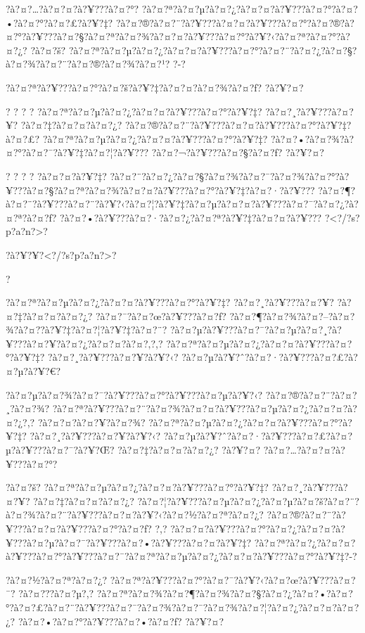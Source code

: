 \documentclass[11pt, openany]{book}
\begin{document}
{{{{{{{{{{{?à?¤?\ldots{}?à?¤?¤?à?¥???à?¤?°?
?à?¤?ª?à?¤?µ?à?¤?¿?à?¤?¤?à?¥???à?¤?°?à?¤?•?à?¤?°?à?¤?£?à?¥?‡?
?à?¤?®?à?¤?¨?à?¥???à?¤?¤?à?¥???à?¤?°?à?¤?®?à?¤?°?à?¥???à?¤?§?à?¤?ª?à?¤?¾?à?¤?¤?à?¥???à?¤?°?à?¥?‹?à?¤?ª?à?¤?°?à?¤?¿?
?à?¤?š?
?à?¤?ª?à?¤?µ?à?¤?¿?à?¤?¤?à?¥???à?¤?°?à?¤?¨?à?¤?¿?à?¤?§?à?¤?¾?à?¤?¨?à?¤?®?à?¤?¾?à?¤?¹?
?-?

?à?¤?ª?à?¥???à?¤?°?à?¤?š?à?¥?‡?à?¤?¤?à?¤?¾?à?¤?ƒ? ?à?¥?¤?

? ? ? ? ?à?¤?ª?à?¤?µ?à?¤?¿?à?¤?¤?à?¥???à?¤?°?à?¥?‡? ?à?¤?¸?à?¥???à?¤?¥?
?à?¤?‡?à?¤?¤?à?¤?¿? ?à?¤?®?à?¤?¨?à?¥???à?¤?¤?à?¥???à?¤?°?à?¥?‡?à?¤?£?
?à?¤?ª?à?¤?µ?à?¤?¿?à?¤?¤?à?¥???à?¤?°?à?¥?‡?
?à?¤?•?à?¤?¾?à?¤?°?à?¤?¯?à?¥?‡?à?¤?¦?à?¥??? ?à?¤?¬?à?¥???à?¤?§?à?¤?ƒ?
?à?¥?¤?

? ? ? ? ?à?¤?¤?à?¥?‡?
?à?¤?¨?à?¤?¿?à?¤?§?à?¤?¾?à?¤?¯?à?¤?¾?à?¤?°?à?¥???à?¤?§?à?¤?ª?à?¤?¾?à?¤?¤?à?¥???à?¤?°?à?¥?‡?à?¤?·?à?¥???
?à?¤?¶?à?¤?¨?à?¥???à?¤?¨?à?¥?‹?à?¤?¦?à?¥?‡?à?¤?µ?à?¤?¤?à?¥???à?¤?¯?à?¤?¿?à?¤?ª?à?¤?ƒ?
?à?¤?•?à?¥???à?¤?·?à?¤?¿?à?¤?ª?à?¥?‡?à?¤?¤?à?¥???
?\textless{}?/?s?p?a?n?\textgreater{}?

?à?¥?¥?\textless{}?/?s?p?a?n?\textgreater{}?

?

?à?¤?ª?à?¤?µ?à?¤?¿?à?¤?¤?à?¥???à?¤?°?à?¥?‡? ?à?¤?¸?à?¥???à?¤?¥?
?à?¤?‡?à?¤?¤?à?¤?¿? ?à?¤?¯?à?¤?œ?à?¥???à?¤?ƒ?
?à?¤?¶?à?¤?¾?à?¤?--?à?¤?¾?à?¤?­?à?¥?‡?à?¤?¦?à?¥?‡?à?¤?¨?
?à?¤?µ?à?¥???à?¤?¯?à?¤?µ?à?¤?¸?à?¥???à?¤?¥?à?¤?¿?à?¤?¤?à?¤?‚?,?
?à?¤?ª?à?¤?µ?à?¤?¿?à?¤?¤?à?¥???à?¤?°?à?¥?‡? ?à?¤?¸?à?¥???à?¤?¥?à?¥?‹?
?à?¤?µ?à?¥?ˆ?à?¤?·?à?¥???à?¤?£?à?¤?µ?à?¥?€?

?à?¤?µ?à?¤?¾?à?¤?¯?à?¥???à?¤?°?à?¥???à?¤?µ?à?¥?‹?
?à?¤?®?à?¤?¨?à?¤?¸?à?¤?¾?
?à?¤?ª?à?¥???à?¤?¨?à?¤?¾?à?¤?¤?à?¥???à?¤?µ?à?¤?¿?à?¤?¤?à?¤?¿?,?
?à?¤?¤?à?¤?¥?à?¤?¾? ?à?¤?ª?à?¤?µ?à?¤?¿?à?¤?¤?à?¥???à?¤?°?à?¥?‡?
?à?¤?¸?à?¥???à?¤?¥?à?¥?‹?
?à?¤?µ?à?¥?ˆ?à?¤?·?à?¥???à?¤?£?à?¤?µ?à?¥???à?¤?¯?à?¥?Œ?
?à?¤?‡?à?¤?¤?à?¤?¿? ?à?¥?¤? ?à?¤?\ldots{}?à?¤?¤?à?¥???à?¤?°?

?à?¤?š? ?à?¤?ª?à?¤?µ?à?¤?¿?à?¤?¤?à?¥???à?¤?°?à?¥?‡? ?à?¤?¸?à?¥???à?¤?¥?
?à?¤?‡?à?¤?¤?à?¤?¿?
?à?¤?¦?à?¥???à?¤?µ?à?¤?¿?à?¤?µ?à?¤?š?à?¤?¨?à?¤?¾?à?¤?¨?à?¥???à?¤?¤?à?¥?‹?à?¤?½?à?¤?ª?à?¤?¿?
?à?¤?®?à?¤?¨?à?¥???à?¤?¤?à?¥???à?¤?°?à?¤?ƒ? ?,?
?à?¤?¤?à?¥???à?¤?°?à?¤?¿?à?¤?¤?à?¥???à?¤?µ?à?¤?¯?à?¥???à?¤?•?à?¥???à?¤?¤?à?¥?‡?
?à?¤?ª?à?¤?¿?à?¤?¤?à?¥???à?¤?°?à?¥???à?¤?¯?à?¤?ª?à?¤?µ?à?¤?¿?à?¤?¤?à?¥???à?¤?°?à?¥?‡?-?

?à?¤?½?à?¤?ª?à?¤?¿? ?à?¤?ª?à?¥???à?¤?°?à?¤?¯?à?¥?‹?à?¤?œ?à?¥???à?¤?¯?
?à?¤???à?¤?µ?,?
?à?¤?ª?à?¤?¾?à?¤?¶?à?¤?¾?à?¤?§?à?¤?¿?à?¤?•?à?¤?°?à?¤?£?à?¤?¨?à?¥???à?¤?¯?à?¤?¾?à?¤?¯?à?¤?¾?à?¤?¦?à?¤?¿?à?¤?¤?à?¤?¿?
?à?¤?•?à?¤?°?à?¥???à?¤?•?à?¤?ƒ? ?à?¥?¤?

}}}}}}}}}}}
\end{document}
